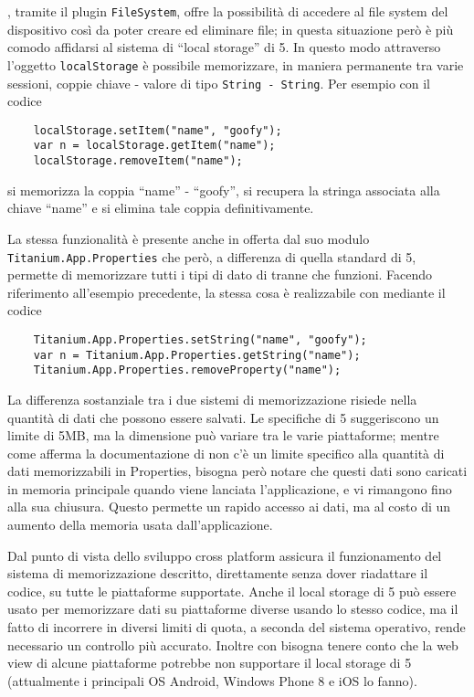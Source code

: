             \pg{}, tramite il plugin
            \texttt{FileSystem}, offre la possibilità di accedere al file system
            del dispositivo così da poter creare ed eliminare file; in questa
            situazione però è più comodo affidarsi al sistema di ``lo\-cal stor\-age''
            di \html{}5. In questo modo attraverso l'oggetto \js{} \texttt{localStorage}
            è possibile memorizzare, in maniera permanente tra varie sessioni, coppie
            chiave - valore di tipo \texttt{String - String}. Per esempio con il
            codice
            \begin{lstlisting}
    localStorage.setItem("name", "goofy");
    var n = localStorage.getItem("name");
    localStorage.removeItem("name");
            \end{lstlisting}
            si memorizza la coppia ``name'' - ``goofy'', si recupera la stringa associata
            alla chiave ``name'' e si elimina tale coppia definitivamente.

            La stessa funzionalità è presente anche in \tisdk{} offerta dal suo
            modulo \texttt{Titanium.App.Properties} che però, a differenza di
            quella standard di \html{}5, permette di memorizzare tutti i tipi di
            dato di \js{} tranne che funzioni. Facendo riferimento all'esempio
            precedente, la stessa cosa è realizzabile con \tisdk mediante il
            codice
            \begin{lstlisting}
    Titanium.App.Properties.setString("name", "goofy");
    var n = Titanium.App.Properties.getString("name");
    Titanium.App.Properties.removeProperty("name");
            \end{lstlisting}

            La differenza sostanziale tra i due sistemi di memorizzazione risiede
            nella quantità di dati che possono essere salvati.
            Le specifiche di \html{}5 suggeriscono un limite di 5MB, ma la dimensione
            può variare tra le varie piattaforme; mentre come afferma la documentazione
            di \tisdk{} non c'è un limite specifico alla quantità di dati memorizzabili
            in Properties, bisogna però notare che questi dati sono caricati in
            memoria principale quando
            viene lanciata l'applicazione, e vi rimangono fino alla sua chiusura.
            Questo permette un rapido accesso ai dati, ma al costo di un aumento
            della memoria usata dall'applicazione.

            Dal punto di vista dello sviluppo cross platform \tisdk{} assicura il funzionamento
            del sistema di memorizzazione descritto, direttamente senza dover riadattare il codice,
            su tutte le piattaforme supportate. Anche il local storage
            di \html{}5 può essere usato per memorizzare dati su piattaforme diverse
            usando lo stesso codice, ma il fatto di incorrere in diversi limiti di quota,
            a seconda del sistema operativo, rende necessario un controllo più
            accurato. Inoltre con \pg{} bisogna tenere conto che la web view di
            alcune piattaforme potrebbe non supportare il local storage di \html{}5
            (attualmente i principali OS Android, Windows Phone 8 e iOS lo fanno).

